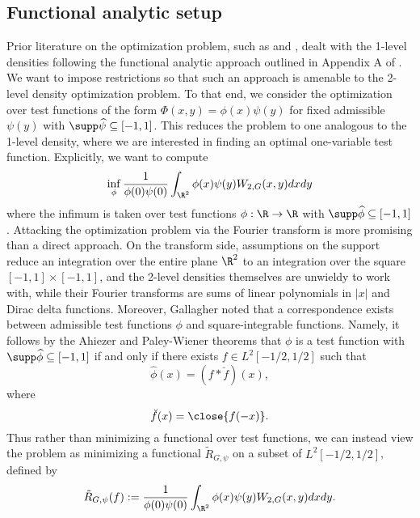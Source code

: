\subsection{Functional analytic setup}

Prior literature on the optimization problem, such as \cite{FreemanMiller} and \cite{FreemanThesis}, dealt with the 1-level densities following the functional analytic approach outlined in Appendix A of \cite{ILS}. We want to impose restrictions so that such an approach is amenable to the 2-level density optimization problem. To that end, we consider the optimization over test functions of the form $\Phi(x, y) = \phi(x) \psi(y)$ for fixed admissible $\psi(y)$ with $\supp \widehat\psi \subseteq [-1, 1]$. This reduces the problem to one analogous to the 1-level density, where we are interested in finding an optimal one-variable test function. Explicitly, we want to compute
\begin{equation}
    \inf_\phi \frac{1}{\phi(0) \psi(0)} \int_{\R^2} \phi(x) \psi(y) W_{2, G} (x, y) dx dy \label{eq:2minimize}
\end{equation}
where the infimum is taken over test functions $\phi : \R \to \R$ with $\supp \widehat \phi \subseteq [-1, 1]$. Attacking the optimization problem via the Fourier transform is more promising than a direct approach. On the transform side, assumptions on the support reduce an integration over the entire plane $\R^2$ to an integration over the square $[-1, 1] \times [-1, 1]$, and the 2-level densities themselves are unwieldy to work with, while their Fourier transforms are sums of linear polynomials in $|x|$ and Dirac delta functions. Moreover, Gallagher \cite{Gallagher} noted that a correspondence exists between admissible test functions $\phi$ and square-integrable functions. Namely, it follows by the Ahiezer and Paley-Wiener theorems that $\phi$ is a test function with $\supp \widehat \phi \subseteq [-1, 1]$ if and only if there exists $f \in L^2 [-1/2, 1/2]$ such that
	\begin{equation}
		\widehat \phi (x) = (f * \breve{f} ) (x),
	\end{equation}	
where
	\begin{equation}
		\breve{f} (x) = \close{f( - x)}. 
	\end{equation}	
Thus rather than minimizing a functional over test functions, we can instead view the problem as minimizing a functional $\tilde R_{G, \psi}$ on a subset of $L^2 [-1/2, 1/2]$, defined by 
	\begin{equation}
		\tilde R_{G, \psi} (f) := \frac{1}{\phi(0) \psi(0)} \int_{\R^2} \phi(x) \psi(y) W_{2, G} (x, y) dx dy. \label{eq:originalfunctional}
	\end{equation}
